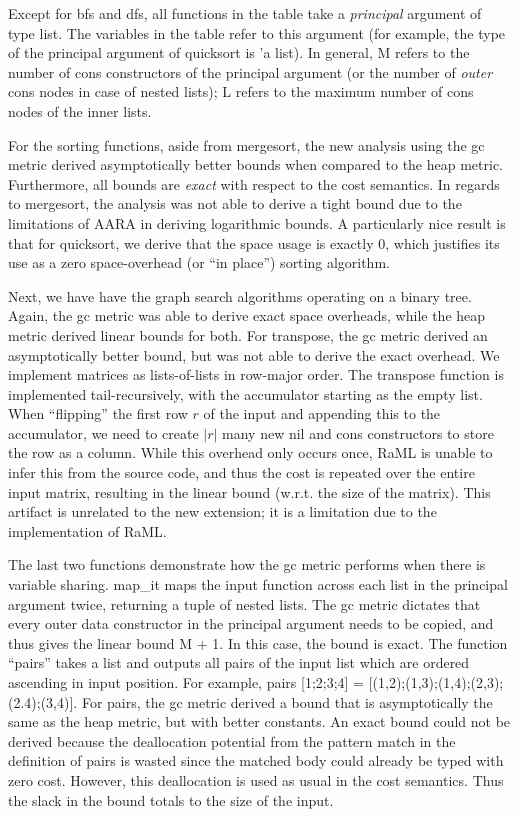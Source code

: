\documentclass{easychair}
\theoremstyle{definition}
\begin{document}
Except for bfs and dfs, all functions in the table take a \emph{principal} argument of type list. 
The variables in the table refer to this argument (for example, the type of the 
principal argument of 
quicksort is 'a list). In general, M refers to the number of cons constructors of the principal 
argument (or the number of \emph{outer} cons nodes in case of nested lists); L refers to the
maximum number of cons nodes of the inner lists.

For the sorting functions, aside from mergesort, the new analysis using the gc metric
derived asymptotically better bounds when compared to the heap metric. Furthermore,
all bounds are \emph{exact} with respect to the cost semantics. In regards to mergesort, 
the analysis was not able to derive a tight bound due to the limitations of AARA in deriving 
logarithmic bounds. A particularly nice result is that for quicksort, we derive that
the space usage is exactly 0, which justifies its use as a zero space-overhead 
(or ``in  place'') sorting algorithm.

Next, we have have the graph search algorithms operating on a binary tree. Again, the gc metric
was able to derive exact space overheads, while the heap metric derived linear bounds for both.
%
For transpose, the gc metric derived an asymptotically better bound, but was not able to derive 
the exact overhead. We implement matrices as lists-of-lists in row-major order. 
The transpose function is implemented tail-recursively, with the accumulator starting as the 
empty list. When ``flipping'' the first row $r$ of the input and appending this to the accumulator, 
we need to create $|r|$ many new nil and cons constructors to store the row as a column. While this
overhead only occurs once, RaML is unable to infer this from the source code, and thus the cost
is repeated over the entire input matrix, resulting in the linear bound (w.r.t. the size of the 
matrix). This artifact is unrelated to the new extension; it is a limitation
due to the implementation of RaML. 

The last two functions demonstrate how the gc metric performs when there is variable sharing.
map\_it maps the input function across each list in the principal argument twice, returning a
tuple of nested lists. The gc metric dictates that every outer data constructor in the 
principal argument needs to be copied, and thus gives the linear bound M + 1. In this case,
the bound is exact. The function ``pairs'' takes a list and outputs all pairs of the input list 
which are ordered ascending in input position. For example, 
pairs [1;2;3;4] = [(1,2);(1,3);(1,4);(2,3);(2.4);(3,4)]. For pairs, the gc metric derived a bound
that is asymptotically the same as the heap metric, but with better constants. An exact bound 
could not be derived because the deallocation potential from the pattern match in the 
definition of pairs is wasted since the matched body could already be typed with zero cost. 
However, this deallocation is used as usual in the cost semantics. Thus the slack in the bound 
totals to the size of the input. %
\end{document}

